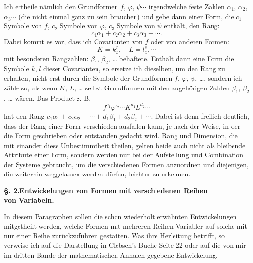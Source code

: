 \documentclass[10pt]{article}
\begin{document}
Ich ertheile nämlich den Grundformen $f$, $\varphi$, $\psi\cdots$ irgendwelche feste Zahlen $\alpha_1$, $\alpha_2$, $\alpha_3\cdots$ (die nicht einmal ganz zu sein brauchen) und gebe dann einer Form, die $c_1$ Symbole von $f$, $c_2$ Symbole von $\varphi$, $c_3$ Symbole von $\psi$ enthält, den Rang:
\[
c_1\alpha_1+c_2\alpha_2+c_3\alpha_3+\cdots.
\]
Dabei kommt es vor, dass ich Covarianten von $f$ oder von anderen Formen:
\[
K=k_x^r,\quad L=l_x^s,\cdots
\]
mit besonderen Rangzahlen: $\beta_1$, $\beta_2$, \ldots{} behaftete. Enthält dann eine Form die Symbole $k$, $l$ dieser Covarianten, so ersetze ich dieselben, um den Rang zu erhalten, nicht erst durch die Symbole der Grundformen $f$, $\varphi$, $\psi$, \ldots, sondern ich zähle so, als wenn $K$, $L$, \ldots{} selbst Grundformen mit den zugehörigen Zahlen $\beta_1$, $\beta_2$, \ldots{} wären. Das Product z. B.
\[
f^{c_1}\varphi^{c_2}\cdots K^{d_1}L^{d_2}\cdots
\]
hat den Rang $c_1\alpha_1+c_2\alpha_2+\cdots+d_1\beta_1+d_2\beta_2+\cdots$. Dabei ist denn freilich deutlich, dass der Rang einer Form verschieden ausfallen kann, je nach der Weise, in der die Form geschrieben oder entstanden gedacht wird. Rang und Dimension, die mit einander diese Unbestimmtheit theilen, gelten beide auch nicht als bleibende Attribute einer Form, sondern werden nur bei der Aufstellung und Combination der Systeme gebraucht, um die verschiedenen Formen anzuordnen und diejenigen, die weiterhin weggelassen werden dürfen, leichter zu erkennen.

\begin{center}
{\bfseries §. 2.\quad Entwickelungen von Formen mit verschiedenen Reihen\\ von Variabeln.}
\end{center}

In diesem Paragraphen sollen die schon wiederholt erwähnten Entwickelungen mitgetheilt werden, welche Formen mit mehreren Reihen Variabler auf solche mit nur einer Reihe zurückzuführen gestatten. Was ihre Herleitung betrifft, so verweise ich auf die Darstellung in Clebsch's Buche Seite 22 oder auf die von mir im dritten Bande der mathematischen Annalen gegebene Entwickelung.
\end{document}
